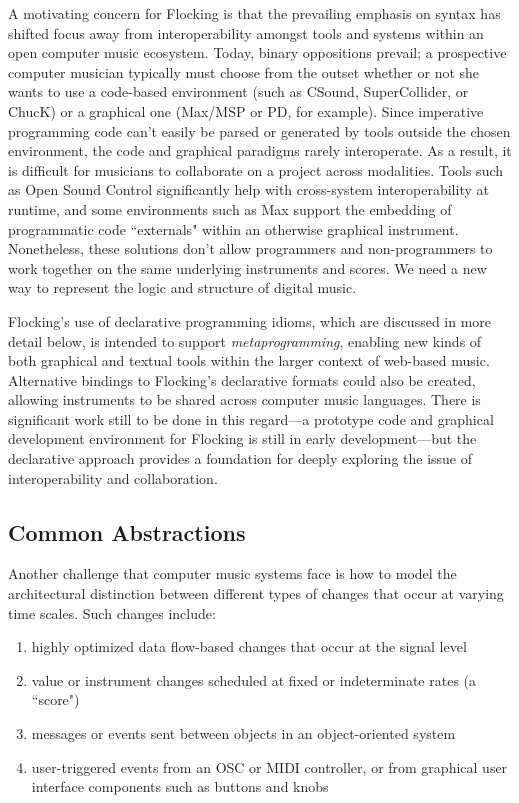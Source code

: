 \documentclass{article}
\begin{document}
A motivating concern for Flocking is that the prevailing emphasis on syntax has shifted focus away from interoperability amongst tools and systems within an open computer music ecosystem. Today, binary oppositions prevail; a prospective computer musician typically must choose from the outset whether or not she wants to use a code-based environment (such as CSound, SuperCollider, or ChucK) or a graphical one (Max/MSP or PD, for example). Since imperative programming code can't easily be parsed or generated by tools outside the chosen environment, the code and graphical paradigms rarely interoperate. As a result, it is difficult for musicians to collaborate on a project across modalities. Tools such as Open Sound Control \cite{wright1997open} significantly help with cross-system interoperability at runtime, and some environments such as Max support the embedding of programmatic code ``externals" within an otherwise graphical instrument. Nonetheless, these solutions don't allow programmers and non-programmers to work together on the same underlying instruments and scores. We need a new way to represent the logic and structure of digital music.

Flocking's use of declarative programming idioms, which are discussed in more detail below, is intended to support {\it metaprogramming}, enabling new kinds of both graphical and textual tools within the larger context of web-based music. Alternative bindings to Flocking's declarative formats could also be created, allowing instruments to be shared across computer music languages. There is significant work still to be done in this regard---a prototype code and graphical development environment for Flocking is still in early development---but the declarative approach provides a foundation for deeply exploring the issue of interoperability and collaboration.

\subsection{Common Abstractions}

Another challenge that computer music systems face is how to model the architectural distinction between different types of changes that occur at varying time scales. Such changes include:

\begin{enumerate}
\item highly optimized data flow-based changes that occur at the signal level
\item value or instrument changes scheduled at fixed or indeterminate rates (a ``score")
\item messages or events sent between objects in an object-oriented system
\item user-triggered events from an OSC or MIDI controller, or from graphical user interface components such as buttons and knobs
\end{enumerate}
\end{document}
